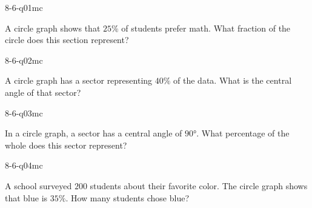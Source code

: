 

\begin{practiceQuestion}{8-6-q01}{mc}
\begin{questionText}
A circle graph shows that $25\%$ of students prefer math. What fraction of the circle does this section represent?
\end{questionText}
\end{practiceQuestion}

\begin{practiceQuestion}{8-6-q02}{mc}
\begin{questionText}
A circle graph has a sector representing $40\%$ of the data. What is the central angle of that sector?
\end{questionText}
\end{practiceQuestion}

\begin{practiceQuestion}{8-6-q03}{mc}
\begin{questionText}
In a circle graph, a sector has a central angle of $90°$. What percentage of the whole does this sector represent?
\end{questionText}
\end{practiceQuestion}

\begin{practiceQuestion}{8-6-q04}{mc}
\begin{questionText}
A school surveyed $200$ students about their favorite color. The circle graph shows that blue is $35\%$. How many students chose blue?
\end{questionText}
\end{practiceQuestion}

